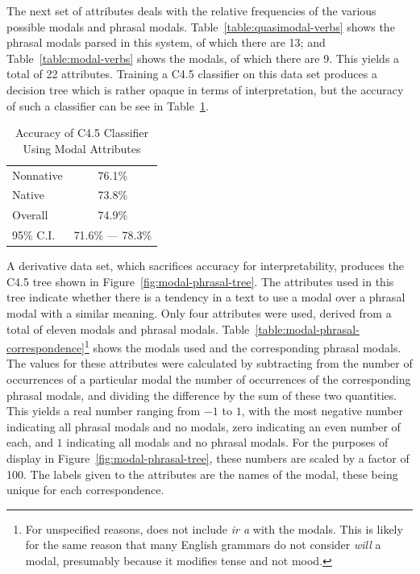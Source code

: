 \documentclass[main.tex]{subfiles}
\begin{document}
The next set of attributes deals with the relative frequencies of the various possible modals and phrasal modals. Table~\ref{table:quasimodal-verbs} shows the phrasal modals parsed in this system, of which there are 13; and Table~\ref{table:modal-verbs} shows the modals, of which there are 9. This yields a total of 22 attributes. Training a C4.5 classifier on this data set produces a decision tree which is rather opaque in terms of interpretation, but the accuracy of such a classifier can be see in Table~\ref{table:modal-attributes-results}. 
\begin{table}[htbp]
\centering
\caption{Accuracy of C4.5 Classifier Using Modal Attributes}
\begin{tabular}{l c}
\toprule
Nonnative & 76.1\% \\
Native & 73.8\% \\
Overall & 74.9\% \\
95\% C.I. & 71.6\% --- 78.3\%\\
\bottomrule
\end{tabular}
\label{table:modal-attributes-results}
\end{table}
A derivative data set, which sacrifices accuracy for interpretability, produces the C4.5 tree shown in Figure~\ref{fig:modal-phrasal-tree}. The attributes used in this tree indicate whether there is a tendency in a text to use a modal over a phrasal modal with a similar meaning. Only four attributes were used, derived from a total of eleven modals and phrasal modals. Table~\ref{table:modal-phrasal-correspondence}\footnote{For unspecified reasons, \citet{butt} does not include \textit{ir a} with the modals. This is likely for the same reason that many English grammars do not consider \textit{will} a modal, presumably because it modifies tense and not mood.} shows the modals used and the corresponding phrasal modals. The values for these attributes were calculated by subtracting from the number of occurrences of a particular modal the number of occurrences of the corresponding phrasal modals, and dividing the difference by the sum of these two quantities. This yields a real number ranging from $-1$ to $1$, with the most negative number indicating all phrasal modals and no modals, zero indicating an even number of each, and $1$ indicating all modals and no phrasal modals. For the purposes of display in Figure~\ref{fig:modal-phrasal-tree}, these numbers are scaled by a factor of 100. The labels given to the attributes are the names of the modal, these being unique for each correspondence.
\end{document}
